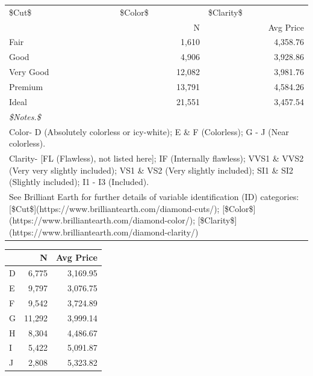 \documentclass[
]{article}
\begin{document}
\begin{table}
\caption{\label{tab:tables}<b>Table 1.</b><br><i>Number of Occurances and Average Price for each Categorical Variable</i>}
\begin{table}

\centering
\begin{tabular}[t]{lrr}
\toprule
\multicolumn{1}{l}{\$Cut\$} & \multicolumn{1}{l}{\$Color\$} & \multicolumn{1}{l}{\$Clarity\$} \\
\cmidrule(l{3pt}r{3pt}){1-1} \cmidrule(l{3pt}r{3pt}){2-2} \cmidrule(l{3pt}r{3pt}){3-3}
 & N & Avg Price\\
\midrule
Fair & 1,610 & 4,358.76\\
Good & 4,906 & 3,928.86\\
Very Good & 12,082 & 3,981.76\\
Premium & 13,791 & 4,584.26\\
Ideal & 21,551 & 3,457.54\\
\bottomrule
\multicolumn{3}{l}{\rule{0pt}{1em}\textit{\$Notes.\$ }}\\
\multicolumn{3}{l}{\rule{0pt}{1em}Color- D (Absolutely colorless or icy-white); E \& F (Colorless); G - J (Near colorless).}\\
\multicolumn{3}{l}{\rule{0pt}{1em}Clarity- [FL (Flawless), not listed here]; IF (Internally flawless); VVS1 \& VVS2 (Very very slightly included); VS1 \& VS2 (Very slightly included); SI1 \& SI2 (Slightly included); I1 - I3 (Included).}\\
\multicolumn{3}{l}{\rule{0pt}{1em}See Brilliant Earth for further details of variable identification (ID) categories: [\$Cut\$](https://www.brilliantearth.com/diamond-cuts/); [\$Color\$](https://www.brilliantearth.com/diamond-color/); [\$Clarity\$](https://www.brilliantearth.com/diamond-clarity/)}\\
\end{tabular}
\end{table}\begin{table}

\centering
\begin{tabular}[t]{lrr}
\toprule
 & N & Avg Price\\
\midrule
D & 6,775 & 3,169.95\\
E & 9,797 & 3,076.75\\
F & 9,542 & 3,724.89\\
G & 11,292 & 3,999.14\\
H & 8,304 & 4,486.67\\
\addlinespace
I & 5,422 & 5,091.87\\
J & 2,808 & 5,323.82\\
\bottomrule
\end{tabular}
\end{table}\begin{table}


\end{table}
\end{table}
\end{document}
